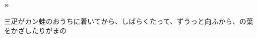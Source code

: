 \documentclass[
a4paper,
10pt,
book]
{tarticle}
\begin{document}
\indent \indent \indent \indent \indent \indent \indent \indent \indent \indent ※

\begin{linenumbers}
    \indent 三疋がカン蛙のおうちに着いてから、しばらくたって、ずうっと向ふから、の葉をかざしたりがまの
\end{linenumbers}

\newpage
\setcounter{page}{23}
\thispagestyle{fancy}
\end{document}
